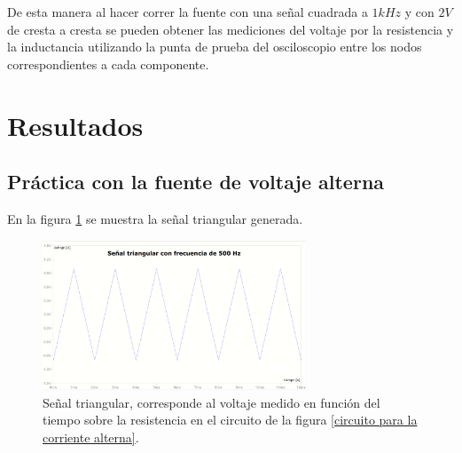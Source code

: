 \documentclass[letterpaper,11pt]{article} %
\begin{document}
De esta manera al hacer correr la fuente con una señal cuadrada a $1kHz$ y con $2V$ de cresta a cresta se pueden obtener las mediciones del voltaje por la resistencia y la inductancia utilizando la punta de prueba del osciloscopio entre los nodos correspondientes a cada componente.

\newpage
\section{Resultados}
\subsection{Práctica con la fuente de voltaje alterna}
En la figura \ref{señal triangular experiencia 1} se muestra la señal triangular generada.
\begin{figure}
    \centering    
    \includegraphics[width=0.7\textwidth]{experiencia 1 voltaje señal triangular 500 Hz.png}
    \caption{Señal triangular, corresponde al voltaje medido en función del tiempo sobre la resistencia en el circuito de la figura \ref{circuito para la corriente alterna}. }
    \label{señal triangular experiencia 1}
\end{figure}
\end{document}
